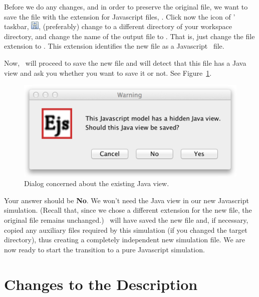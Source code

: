 Before we do any changes, and in order to preserve the original file, we want to save the file with the extension for Javascript files, . Click now the  icon of \ejs' taskbar, \includegraphics[scale=\linescale]{../_common/icons_png/saveAsSmall.png}, (preferably) change to a different directory of your workspace  directory, and change the name of the output file to . That is, just change the file  extension to . This extension identifies the new file as a Javascript \ejs\ file.

Now, \ejs\ will proceed to save the new file and will detect that this file has a Java view and ask you whether you want to save it or not. See Figure~\ref{fig:04JavatoJS/ForgetJavaView}.

\begin{figure}[htb]
  \centering
  \includegraphics[scale=\scale]{04JavatoJS/images/ForgetJavaView.png}
  \caption{Dialog concerned about the existing Java view.}
  \label{fig:04JavatoJS/ForgetJavaView}
\end{figure}

\noindent Your answer should be \textbf{No}. We won't need the Java view in our new Javascript simulation. (Recall that, since we chose a different extension for the new file, the original  file remains unchanged.) \ejs\ will have saved the new file and, if necessary, copied any auxiliary files required by this simulation (if you changed the target directory), thus creating a completely independent new simulation file. We are now ready to start the transition to a pure Javascript simulation.

    \section{Changes to the Description}\label{section:04Description}

